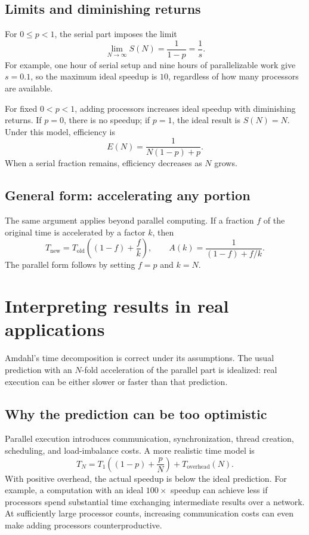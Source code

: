 \documentclass[11pt,a4paper]{article}
\begin{document}
\subsection{Limits and diminishing returns}
For $0\leq p<1$, the serial part imposes the limit
\begin{equation}
  \boxed{\lim_{N\to\infty}S(N)=\frac{1}{1-p}=\frac{1}{s}.}
\end{equation}
For example, one hour of serial setup and nine hours of parallelizable work
give $s=0.1$, so the maximum ideal speedup is $10$, regardless of how many
processors are available.

For fixed $0<p<1$, adding processors increases ideal speedup with diminishing
returns. If $p=0$, there is no speedup; if $p=1$, the ideal result is $S(N)=N$.
Under this model, efficiency is
\[
  E(N)=\frac{1}{N(1-p)+p}.
\]
When a serial fraction remains, efficiency decreases as $N$ grows.

\subsection{General form: accelerating any portion}
The same argument applies beyond parallel computing. If a fraction $f$ of
the original time is accelerated by a factor $k$, then
\[
  T_{\mathrm{new}}=T_{\mathrm{old}}\left((1-f)+\frac{f}{k}\right),
  \qquad A(k)=\frac{1}{(1-f)+f/k}.
\]
The parallel form follows by setting $f=p$ and $k=N$.

\newpage
\section{Interpreting results in real applications}
Amdahl's time decomposition is correct under its assumptions. The usual
prediction with an $N$-fold acceleration of the parallel part is idealized:
real execution can be either slower or faster than that prediction.

\subsection{Why the prediction can be too optimistic}
Parallel execution introduces communication, synchronization, thread creation,
scheduling, and load-imbalance costs. A more realistic time model is
\begin{equation}
  T_N=T_1\left((1-p)+\frac{p}{N}\right)+T_{\mathrm{overhead}}(N).
\end{equation}
With positive overhead, the actual speedup is below the ideal prediction.
For example, a computation with an ideal $100\times$ speedup can achieve
less if processors spend substantial time exchanging intermediate results
over a network. At sufficiently large processor counts, increasing communication
costs can even make adding processors counterproductive.
\end{document}
